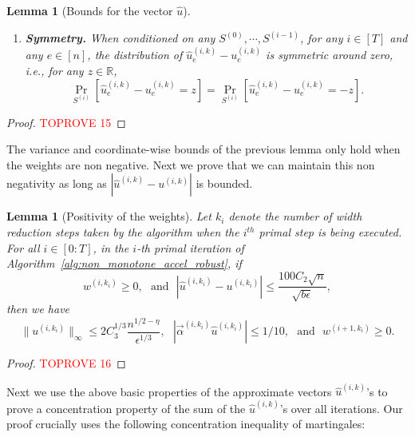 \documentclass[11pt]{article}
\newtheorem{lemma}[theorem]{Lemma}
\let\originalleft\left
\let\originalright\right
\renewcommand{\left}{\mathopen{}\mathclose\bgroup\originalleft}
\renewcommand{\right}{\aftergroup\egroup\originalright}
\newcommand\uu{\boldsymbol{\mathit{u}}}
\newcommand\ww{\boldsymbol{\mathit{w}}}
\newcommand\rrbar{\overline{\boldsymbol{\mathit{r}}}}
\renewcommand\SS{\boldsymbol{\mathit{S}}}
\newcommand{\wh}{\widehat}
\newcommand\R{\mathbb{R}}
\begin{document}
\begin{lemma}[Bounds for the vector $\wh{\uu}$]
\begin{enumerate}
\begin{itemize}
\begin{align*}
\Pr_{\SS^{(i)}}\left[| \sum_e \ww_e^{(i,k)} \cdot (\wh{\uu}^{(i,k)}_e - \uu^{(i,k)}_e)| \leq \frac{C_2}{\sqrt{b}} \cdot \Phi(\ww^{(i,k)})^{1/2} \cdot \Psi(\rrbar^{(i,k)})^{1/2} \right] \geq &~ 1 - 1/n^4, \\
\Pr_{\SS^{(i)}}\left[| \sum_e \rrbar_e^{(i,k)} \cdot (\wh{\uu}^{(i,k)}_e - \uu^{(i,k)}_e)| \leq \frac{C_2 (1 + \epsilon)}{\sqrt{b}} \cdot \Phi(\ww^{(i,k)})^{1/2} \cdot \Psi(\rrbar^{(i,k)})^{1/2} \right] \geq &~ 1 - 1/n^4.
\end{align*}
\end{itemize}
\item {\bf Symmetry.} When conditioned on any $\SS^{(0)}, \cdots, \SS^{(i-1)}$, for any $i \in [T]$ and any $e \in [n]$, the distribution of $\wh{\uu}^{(i,k)}_e - \uu^{(i,k)}_e$ is symmetric around zero, i.e., for any $z \in \R$, 
\[
\Pr_{\SS^{(i)}}[\wh{\uu}^{(i,k)}_e - \uu^{(i,k)}_e = z] = \Pr_{\SS^{(i)}}[\wh{\uu}^{(i,k)}_e - \uu^{(i,k)}_e = -z].
\]
\end{enumerate}
\end{lemma}
\begin{proof}\textcolor{red}{TOPROVE 15}\end{proof}


The variance and coordinate-wise bounds of the previous lemma only hold when the weights are non negative. Next we prove that we can maintain this non negativity as long as $|\wh{\uu}^{(i,k)} - \uu^{(i,k)}|$ is bounded.


\begin{lemma}[Positivity of the weights]\label{lem:positivity_weights}
Let $k_i$ denote the number of width reduction steps taken by the algorithm when the $i^{th}$ primal step is being executed. For all $i \in [0:T]$, in the $i$-th primal iteration of Algorithm~\ref{alg:non_monotone_accel_robust}, if
\[
\ww^{(i,k_i)} \geq 0, ~~~\text{and}~~~ |\wh{\uu}^{(i,k_i)} - \uu^{(i,k_i)}| \leq \frac{100 C_2 \sqrt{n}}{\sqrt{b \epsilon}},
\]
then we have
\[
\|\uu^{(i,k_i)}\|_{\infty} \leq 2C_3^{1/3}\frac{n^{1/2-\eta}}{\epsilon^{1/3}}, ~~~ |\overrightarrow{\alpha}^{(i,k_i)} \wh{\uu}^{(i,k_i)}| \leq 1 / 10, ~~~\text{and}~~~\ww^{(i+1,k_{i})} \geq 0.
\]
\end{lemma}
\begin{proof}\textcolor{red}{TOPROVE 16}\end{proof}


Next we use the above basic properties of the approximate vectors $\wh{\uu}^{(i,k)}$'s to prove a concentration property of the sum of the $\wh{\uu}^{(i,k)}$'s over all iterations. Our proof crucially uses the following concentration inequality of martingales:
\end{document}
